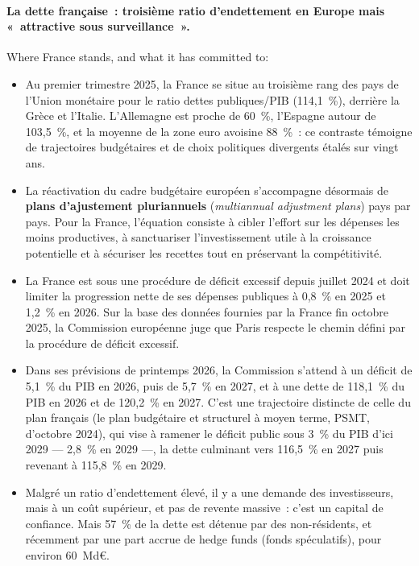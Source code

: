 \paragraph{La dette française~: troisième ratio d'endettement en Europe mais «~attractive sous surveillance~».}
Where France stands, and what it has committed to:
\begin{itemize}
  \item Au premier trimestre 2025, la France se situe au troisième rang des pays
    de l'Union monétaire pour le ratio dettes publiques/PIB (114,1~\%),
    derrière la Grèce et l'Italie. L'Allemagne est proche de 60~\%, l'Espagne
    autour de 103,5~\%, et la moyenne de la zone euro avoisine 88~\%~: ce
    contraste témoigne de trajectoires budgétaires et de choix politiques
    divergents étalés sur vingt ans.
  \item La réactivation du cadre budgétaire européen s'accompagne désormais de
    \textbf{plans d'ajustement pluriannuels} (\textit{multiannual adjustment
    plans}) pays par pays. Pour la France, l'équation consiste à cibler l'effort
    sur les dépenses les moins productives, à sanctuariser l'investissement utile
    à la croissance potentielle et à sécuriser les recettes tout en préservant la
    compétitivité.
  \item La France est sous une procédure de déficit excessif depuis juillet 2024
    et doit limiter la progression nette de ses dépenses publiques à 0,8~\% en
    2025 et 1,2~\% en 2026. Sur la base des données fournies par la France fin
    octobre 2025, la Commission européenne juge que Paris respecte le chemin
    défini par la procédure de déficit excessif.
  \item Dans ses prévisions de printemps 2026, la Commission s'attend à un
    déficit de 5,1~\% du PIB en 2026, puis de 5,7~\% en 2027, et à une dette de
    118,1~\% du PIB en 2026 et de 120,2~\% en 2027. C'est une trajectoire
    distincte de celle du plan français (le plan budgétaire et structurel à
    moyen terme, PSMT, d'octobre 2024), qui vise à ramener le déficit public sous
    3~\% du PIB d'ici 2029 --- 2,8~\% en 2029 ---, la dette culminant vers
    116,5~\% en 2027 puis revenant à 115,8~\% en 2029.
  \item Malgré un ratio d'endettement élevé, il y a une demande des
    investisseurs, mais à un coût supérieur, et pas de revente massive~: c'est
    un capital de confiance. Mais 57~\% de la dette est
    détenue par des non-résidents, et récemment par une part accrue de hedge
    funds (fonds spéculatifs), pour environ 60~Md€.
\end{itemize}

